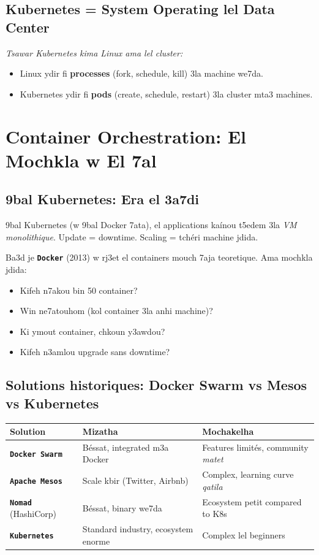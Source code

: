 \documentclass[11pt,a4paper]{book}
\newcommand{\tuni}[1]{\textit{\color{k8sdark}#1}}
\newcommand{\tech}[1]{\texttt{\color{k8sblue}\textbf{#1}}}
\begin{document}
\subsection{Kubernetes = System Operating lel Data Center}

\tuni{Tsawar Kubernetes kima Linux ama lel cluster:}
\begin{itemize}
  \item Linux ydir fi \textbf{processes} (fork, schedule, kill) 3la machine we7da.
  \item Kubernetes ydir fi \textbf{pods} (create, schedule, restart) 3la cluster mta3 machines.
\end{itemize}

\section{Container Orchestration: El Mochkla w El 7al}

\subsection{9bal Kubernetes: Era el 3a7di}

9bal Kubernetes (w 9bal Docker 7ata), el applications ka\'inou t5edem 3la \tuni{VM monolithique}. Update = downtime. Scaling = tch\'eri machine jdida.

Ba3d je \tech{Docker} (2013) w rj3et el containers mouch 7aja teoretique. Ama mochkla jdida:
\begin{itemize}
  \item Kifeh n7akou bin 50 container?
  \item Win ne7atouhom (kol container 3la anhi machine)?
  \item Ki ymout container, chkoun y3awdou?
  \item Kifeh n3amlou upgrade sans downtime?
\end{itemize}

\subsection{Solutions historiques: Docker Swarm vs Mesos vs Kubernetes}

\begin{longtable}{L{3.5cm}L{4cm}L{5.5cm}}
\toprule
\textbf{Solution} & \textbf{Mizatha} & \textbf{Mochakelha} \\
\midrule
\tech{Docker Swarm} & B\'essat, integrated m3a Docker & Features limités, community \tuni{matet} \\
\tech{Apache Mesos} & Scale kbir (Twitter, Airbnb) & Complex, learning curve \tuni{qatila} \\
\tech{Nomad} (HashiCorp) & B\'essat, binary we7da & Ecosystem petit compared to K8s \\
\tech{Kubernetes} & Standard industry, ecosystem enorme & Complex lel beginners \\
\bottomrule
\end{longtable}
\end{document}
